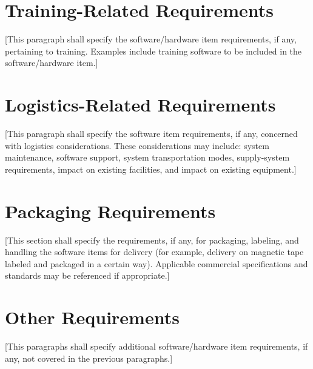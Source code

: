 \section{Training-Related Requirements\label{ref-026}}

[This paragraph shall specify the software/hardware item requirements, if any, pertaining to training. Examples include training software to be included in the software/hardware item.]

\section{Logistics-Related Requirements\label{ref-027}}

[This paragraph shall specify the software item requirements, if any, concerned with logistics considerations. These considerations may include: system maintenance, software support, system transportation modes, supply-system requirements, impact on existing facilities, and impact on existing equipment.] 

\section{Packaging Requirements\label{ref-028}}

[This section shall specify the requirements, if any, for packaging, labeling, and handling the software items for delivery (for example, delivery on magnetic tape labeled and packaged in a certain way). Applicable commercial specifications and standards may be referenced if appropriate.]

\section{Other Requirements\label{ref-029}}

[This paragraphs shall specify additional software/hardware item requirements, if any, not covered in the previous paragraphs.] 
